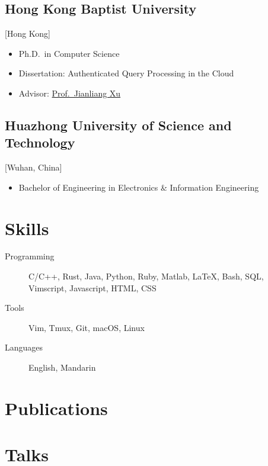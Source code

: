 \documentclass{mycv}
\begin{document}
\subsection{Hong Kong Baptist University}[Hong Kong]
\vspace{-\parskip}%
\begin{itemize}[label={}]
  \item Ph.D.\ in Computer Science 
  \item Dissertation: Authenticated Query Processing in the Cloud
  \item Advisor: \href{https://www.comp.hkbu.edu.hk/~xujl}{Prof.~Jianliang Xu}
\end{itemize}

\subsection{Huazhong University of Science and Technology}[Wuhan, China]
\vspace{-\parskip}%
\begin{itemize}[label={}]
  \item Bachelor of Engineering in Electronics \& Information Engineering 
\end{itemize}

\section{Skills}

\begin{description}
  \item[Programming]
    \parbox[t]{\linegoal}{
      \strut%
      C/C++, Rust, Java, Python, Ruby, Matlab, \LaTeX, Bash, SQL, Vimscript, Javascript, HTML, CSS
      \strut%
    }
  \item[Tools] Vim, Tmux, Git, macOS, Linux
  \item[Languages] English, Mandarin
\end{description}

\section{Publications}%


\section{Talks}
\end{document}
